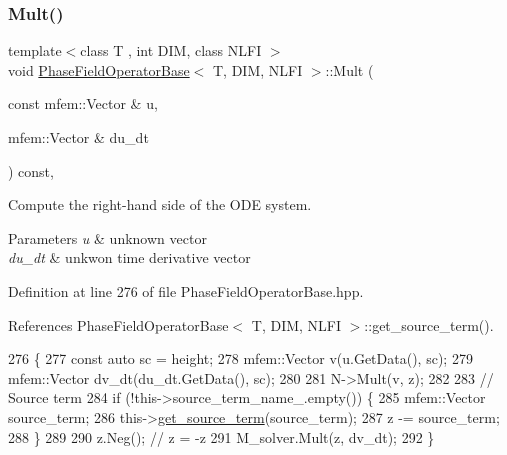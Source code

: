 \subsubsection{\texorpdfstring{Mult()}{Mult()}}
{\footnotesize\ttfamily template$<$class T , int D\+IM, class N\+L\+FI $>$ \\
void \hyperlink{classPhaseFieldOperatorBase}{Phase\+Field\+Operator\+Base}$<$ T, D\+IM, N\+L\+FI $>$\+::Mult (\begin{DoxyParamCaption}\item[{const mfem\+::\+Vector \&}]{u,  }\item[{mfem\+::\+Vector \&}]{du\+\_\+dt }\end{DoxyParamCaption}) const\hspace{0.3cm}{\ttfamily [virtual]}, {\ttfamily [inherited]}}



Compute the right-\/hand side of the O\+DE system. 


\begin{DoxyParams}{Parameters}
{\em u} & unknown vector \\
\hline
{\em du\+\_\+dt} & unkwon time derivative vector \\
\hline
\end{DoxyParams}


Definition at line 276 of file Phase\+Field\+Operator\+Base.\+hpp.



References Phase\+Field\+Operator\+Base$<$ T, D\+I\+M, N\+L\+F\+I $>$\+::get\+\_\+source\+\_\+term().


\begin{DoxyCode}
276                                                                                             \{
277   \textcolor{keyword}{const} \textcolor{keyword}{auto} sc = height;
278   mfem::Vector v(u.GetData(), sc);
279   mfem::Vector dv\_dt(du\_dt.GetData(), sc);
280 
281   N->Mult(v, z);
282 
283   \textcolor{comment}{// Source term}
284   \textcolor{keywordflow}{if} (!this->source\_term\_name\_.empty()) \{
285     mfem::Vector source\_term;
286     this->\hyperlink{classPhaseFieldOperatorBase_ade4aaf43e627fdc8b2a3690839e225d3}{get\_source\_term}(source\_term);
287     z -= source\_term;
288   \}
289 
290   z.Neg();  \textcolor{comment}{// z = -z}
291   M\_solver.Mult(z, dv\_dt);
292 \}
\end{DoxyCode}
\mbox{\label{classPhaseFieldOperatorMelting_a0235f90bea5d33ab4567cf4ff9e3ce83}} 
